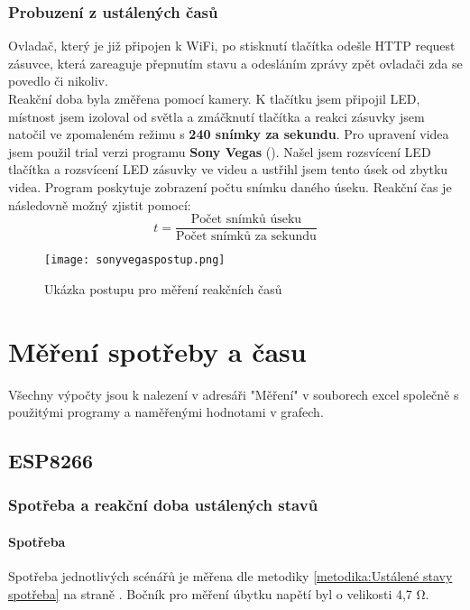 \documentclass[a4paper, 12pt]{report}
\begin{document}
				\subsection{Probuzení z ustálených časů} \label{metodika:Ustálené stavy reakce}
					Ovladač, který je již připojen k WiFi, po stisknutí tlačítka odešle HTTP request zásuvce, která zareaguje přepnutím stavu a odesláním zprávy zpět ovladači zda se povedlo či nikoliv.\\
					Reakční doba byla změřena pomocí kamery. K tlačítku jsem připojil LED, místnost jsem izoloval od světla a zmáčknutí tlačítka a reakci zásuvky jsem natočil ve zpomaleném režimu s {\bf 240 snímky za sekundu}. Pro upravení videa jsem použil trial verzi programu {\bf Sony Vegas} (). Našel jsem rozsvícení LED tlačítka a rozsvícení LED zásuvky ve videu a ustřihl jsem tento úsek od zbytku videa. Program poskytuje zobrazení počtu snímku daného úseku. Reakční čas je následovně možný zjistit pomocí:
					$$ t = \frac{\textrm{Počet snímků úseku}}{\textrm{Počet snímků za sekundu}}$$
					\begin{figure}[h]
						\centering
						\texttt{[image: sonyvegaspostup.png]}
						\caption{Ukázka postupu pro měření reakčních časů}
						\label{sonyvegaspostup}
					\end{figure}

	\chapter{Měření spotřeby a času}
	Všechny výpočty jsou k nalezení v adresáři "Měření"  v souborech excel společně s použitými programy a naměřenými hodnotami v grafech.
		\section{ESP8266}
			\subsection{Spotřeba a reakční doba ustálených stavů}
				\subsubsection{Spotřeba}
					Spotřeba jednotlivých scénářů je měřena dle metodiky \ref{metodika:Ustálené stavy spotřeba} na straně \pageref{metodika:Ustálené stavy spotřeba}. Bočník pro měření úbytku napětí byl o velikosti 4,7 \si{\ohm}. \\
\end{document}
